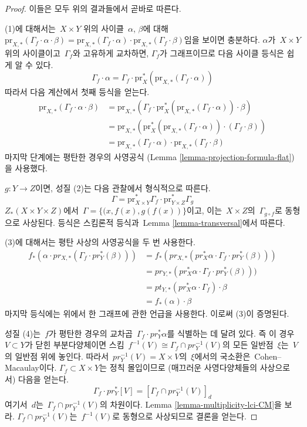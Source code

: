 \begin{proof}
이들은 모두 위의 결과들에서 곧바로 따른다.

\medskip\noindent
(1)에 대해서는\  $X \times Y$ 위의 사이클\  $\alpha$, $\beta$에 대해\ 
$\text{pr}_{X,*}( \Gamma_f \cdot \alpha \cdot \beta) =
\text{pr}_{X,*}(\Gamma_f \cdot \alpha) \cdot
\text{pr}_{X,*}(\Gamma_f \cdot \beta)$임을 보이면 충분하다.
$\alpha$가\  $X \times Y$ 위의 사이클이고\  $\Gamma_f$와 고유하게
교차하면, $\Gamma_f$가 그래프이므로 다음 사이클 등식은 쉽게 알 수 있다.
$$
\Gamma_f \cdot \alpha =
\Gamma_f \cdot \text{pr}_X^*(\text{pr}_{X,*}(\Gamma_f \cdot \alpha))
$$
따라서 다음 계산에서 첫째 등식을 얻는다.
\begin{align*}
\text{pr}_{X,*}(\Gamma_f \cdot \alpha \cdot \beta)
& =
\text{pr}_{X,*}(
\Gamma_f \cdot
\text{pr}_X^*(\text{pr}_{X,*}(\Gamma_f \cdot \alpha)) \cdot \beta) \\
& =
\text{pr}_{X,*}(\text{pr}_X^*(\text{pr}_{X,*}(\Gamma_f \cdot \alpha))
\cdot (\Gamma_f \cdot \beta)) \\
& =
\text{pr}_{X,*}(\Gamma_f \cdot \alpha) \cdot
\text{pr}_{X,*}(\Gamma_f \cdot \beta)
\end{align*}
마지막 단계에는 평탄한 경우의 사영공식
(Lemma \ref{lemma-projection-formula-flat})을 사용했다.

\medskip\noindent
$g : Y \to Z$이면, 성질 (2)는 다음 관찰에서 형식적으로 따른다.
$$
\Gamma =
\text{pr}_{X \times Y}^*\Gamma_f \cdot
\text{pr}_{Y \times Z}^*\Gamma_g
$$
$Z_*(X \times Y \times Z)$에서\  $\Gamma = \{(x, f(x), g(f(x))\}$이고,
이는\  $X \times Z$의\  $\Gamma_{g \circ f}$로 동형으로 사상된다.
등식은 스킴론적 등식과\  Lemma \ref{lemma-transversal}에서 따른다.

\medskip\noindent
(3)에 대해서는 평탄 사상의 사영공식을 두 번 사용한다.
\begin{align*}
f_*(\alpha \cdot pr_{X, *}(\Gamma_f \cdot pr_Y^*(\beta)))
& =
f_*(pr_{X, *}(pr_X^*\alpha \cdot \Gamma_f \cdot pr_Y^*(\beta))) \\
& =
pr_{Y, *}(pr_X^*\alpha \cdot \Gamma_f \cdot pr_Y^*(\beta))) \\
& =
pt_{Y, *}(pr_X^*\alpha \cdot \Gamma_f) \cdot \beta \\
& =
f_*(\alpha) \cdot \beta
\end{align*}
마지막 등식에는 위에서 한 그래프에 관한 언급을 사용한다.
이로써 (3)이 증명된다.

\medskip\noindent
성질 (4)는\  $f$가 평탄한 경우의 교차곱\ 
$\Gamma_f \cdot pr_Y^*\alpha$를 식별하는 데 달려 있다.
즉 이 경우\  $V \subset Y$가 닫힌 부분다양체이면 스킴\ 
$f^{-1}(V) \cong \Gamma_f \cap pr_Y^{-1}(V)$의 모든 일반점\ 
$\xi$는\  $V$의 일반점 위에 놓인다. 따라서\ 
$pr_Y^{-1}(V) = X \times V$의\  $\xi$에서의 국소환은\  Cohen--Macaulay이다.
$\Gamma_f \subset X \times Y$는 정칙 몰입이므로
(매끄러운 사영다양체들의 사상으로서) 다음을 얻는다.
$$
\Gamma_f \cdot pr_Y^*[V] = [\Gamma_f \cap pr_Y^{-1}(V)]_d
$$
여기서\  $d$는\  $\Gamma_f \cap pr_Y^{-1}(V)$의 차원이다. Lemma
\ref{lemma-multiplicity-lci-CM}을 보라.
$\Gamma_f \cap pr_Y^{-1}(V)$는\  $f^{-1}(V)$로 동형으로 사상되므로
결론을 얻는다.
\end{proof}


